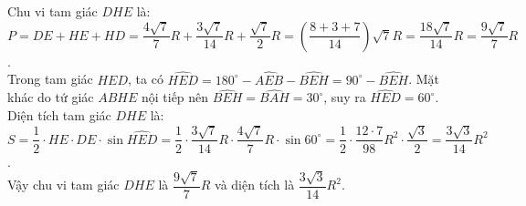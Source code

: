 \begin{bt}
{\begin{enumerate}[a)]
	Chu vi tam giác $DHE$ là:
	$P = DE + HE + HD = \dfrac{4\sqrt{7}}{7}R + \dfrac{3\sqrt{7}}{14}R + \dfrac{\sqrt{7}}{2}R = \left(\dfrac{8 + 3 + 7}{14}\right)\sqrt{7}R = \dfrac{18\sqrt{7}}{14}R = \dfrac{9\sqrt{7}}{7}R$.\\
	Trong tam giác $HED$, ta có $\widehat{HED} = 180^\circ - \widehat{AEB} - \widehat{BEH} = 90^\circ - \widehat{BEH}$. Mặt khác do tứ giác $ABHE$ nội tiếp nên $\widehat{BEH} = \widehat{BAH} = 30^\circ$, suy ra $\widehat{HED} = 60^\circ$.\\
	Diện tích tam giác $DHE$ là:
	$S = \dfrac{1}{2} \cdot HE \cdot DE \cdot \sin\widehat{HED} = \dfrac{1}{2} \cdot \dfrac{3\sqrt{7}}{14}R \cdot \dfrac{4\sqrt{7}}{7}R \cdot \sin 60^\circ = \dfrac{1}{2} \cdot \dfrac{12\cdot 7}{98}R^2 \cdot \dfrac{\sqrt{3}}{2} = \dfrac{3\sqrt{3}}{14}R^2$.\\
	Vậy chu vi tam giác $DHE$ là $\dfrac{9\sqrt{7}}{7}R$ và diện tích là $\dfrac{3\sqrt{3}}{14}R^2$.
\end{enumerate}
}
\end{bt}

